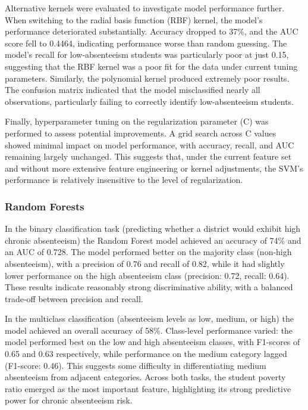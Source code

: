 \documentclass[
  11pt,
]{article}
\begin{document}
Alternative kernels were evaluated to investigate model performance
further. When switching to the radial basis function (RBF) kernel, the
model's performance deteriorated substantially. Accuracy dropped to
37\%, and the AUC score fell to 0.4464, indicating performance worse
than random guessing. The model's recall for low-absenteeism students
was particularly poor at just 0.15, suggesting that the RBF kernel was a
poor fit for the data under current tuning parameters. Similarly, the
polynomial kernel produced extremely poor results. The confusion matrix
indicated that the model misclassified nearly all observations,
particularly failing to correctly identify low-absenteeism students.

Finally, hyperparameter tuning on the regularization parameter (C) was
performed to assess potential improvements. A grid search across C
values showed minimal impact on model performance, with accuracy,
recall, and AUC remaining largely unchanged. This suggests that, under
the current feature set and without more extensive feature engineering
or kernel adjustments, the SVM's performance is relatively insensitive
to the level of regularization.

\subsubsection{Random Forests}\label{random-forests-1}

In the binary classification task (predicting whether a district would
exhibit high chronic absenteeism) the Random Forest model achieved an
accuracy of 74\% and an AUC of 0.728. The model performed better on the
majority class (non-high absenteeism), with a precision of 0.76 and
recall of 0.82, while it had slightly lower performance on the high
absenteeism class (precision: 0.72, recall: 0.64). These results
indicate reasonably strong discriminative ability, with a balanced
trade-off between precision and recall.

In the multiclass classification (absenteeism levels as low, medium, or
high) the model achieved an overall accuracy of 58\%. Class-level
performance varied: the model performed best on the low and high
absenteeism classes, with F1-scores of 0.65 and 0.63 respectively, while
performance on the medium category lagged (F1-score: 0.46). This
suggests some difficulty in differentiating medium absenteeism from
adjacent categories. Across both tasks, the student poverty ratio
emerged as the most important feature, highlighting its strong
predictive power for chronic absenteeism risk.
\end{document}
